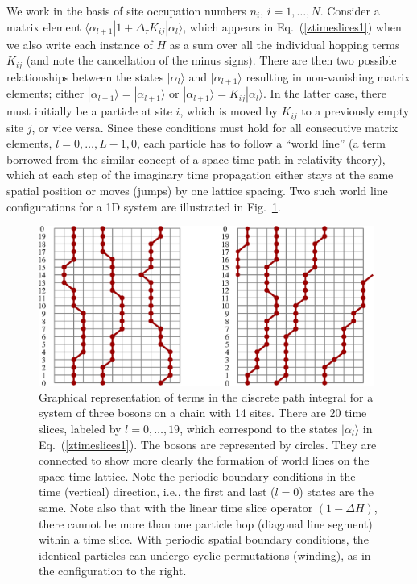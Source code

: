 \documentclass[draft,numberedheadings]{aipproc}
\begin{document}
We work in the basis of site occupation numbers $n_i$, $i=1,\ldots,N$. Consider a matrix element $\langle \alpha_{l+1}|1+\Delta_\tau K_{ij}|\alpha_{l}\rangle$, which 
appears in Eq.~(\ref{ztimeslices1}) when we also write each instance of $H$ as a sum over all the individual hopping terms $K_{ij}$ (and note the cancellation of the 
minus signs). There are then two possible relationships between the states $|\alpha_{l}\rangle$ and $|\alpha_{l+1}\rangle$ resulting in non-vanishing matrix elements; 
either $|\alpha_{l+1}\rangle=|\alpha_{l+1}\rangle$ or $|\alpha_{l+1}\rangle=K_{ij}|\alpha_{l}\rangle$. In the latter case, there must initially be a particle at 
site $i$, which is moved by $K_{ij}$ to a previously empty site $j$, or vice versa. Since these conditions must hold for all consecutive matrix elements, 
$l=0,\ldots,L-1,0$, each particle has to follow a ``world line'' (a term borrowed from the similar concept of a space-time path in relativity theory), which 
at each step of the imaginary time propagation either stays at the same spatial position or moves (jumps) by one lattice spacing. Two such world line 
configurations for a 1D system are illustrated in 
Fig.~\ref{pathintegral}. 

\begin{figure}
\includegraphics[width=11cm]{pathintegral.eps}
\caption{Graphical representation of terms in the discrete path integral for a system of three bosons on a chain with 14 sites. There are 20 time 
slices, labeled by $l=0,\ldots,19$, which correspond to the states $|\alpha_l\rangle$ in Eq.~(\ref{ztimeslices1}). The bosons are represented by circles. They 
are connected to show more clearly the formation of world lines on the space-time lattice. Note the periodic boundary conditions in the time (vertical) direction, 
i.e., the first and last ($l=0$) states are the same. Note also that with the linear time slice operator $(1-\Delta H)$, there cannot be more than one particle 
hop (diagonal line segment) within a time slice. With periodic spatial boundary conditions, the identical particles can undergo cyclic permutations (winding), 
as in the configuration to the right.}
\label{pathintegral}
\end{figure}
\end{document}
